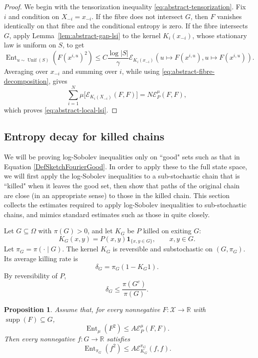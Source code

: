 \documentclass[11pt, reqno]{amsart}
\numberwithin{equation}{section}
\newtheorem{proposition}[theorem]{Proposition}
\newcommand{\Ent}{\operatorname{Ent}}
\newcommand{\cE}{\mathcal E}
\newcommand{\one}{\mathbf 1}
\newcommand{\supp}{\operatorname{supp}}
\newcommand{\Unif}{\operatorname{Unif}}
\begin{document}
\begin{proof}
We begin with the tensorization inequality \eqref{eq:abstract-tensorization}.  Fix \(i\) and condition
on \(X_{-i}=x_{-i}\).  If the fibre does not intersect \(G\), then \(F\)
vanishes identically on that fibre and the conditional entropy is zero.  If the
fibre intersects \(G\), apply Lemma~\ref{lem:abstract-gap-lsi} to the kernel
\(K_i(x_{-i})\), whose stationary law is uniform on \(S\), to get
\[
    \Ent_{u\sim\Unif(S)}(F(x^{i,u})^2)
    \le C\frac{\log |S|}{\gamma}
    \cE_{K_i(x_{-i})}(u\mapsto F(x^{i,u}),u\mapsto F(x^{i,u})).
\]
Averaging over \(x_{-i}\) and summing over \(i\), while using
\eqref{eq:abstract-fibre-decomposition}, gives
\[
    \sum_{i=1}^N\mu\bigl[\cE_{K_i(X_{-i})}(F,F)\bigr]
    =N\cE_P^\mu(F,F),
\]
which proves \eqref{eq:abstract-local-lsi}.
\end{proof}

\subsection{Entropy decay for killed chains}\label{subsec:killed-entropy}

We will be proving log-Sobolev inequalities only on ``good" sets such as that in Equation \eqref{DefSketchFourierGood}. In order to apply these to the full state space, we will first apply the log-Sobolev inequalities to a sub-stochastic chain that is ``killed" when it leaves the good set, then show that paths of the original chain are close (in an appropriate sense) to those in the killed chain. This section collects the estimates required to apply log-Sobolev inequalities to sub-stochastic chains, and mimics standard estimates such as those in \cite{DiaconisSaloffCoste1996LSI} quite closely.

Let \(G\subseteq\Omega\) with \(\pi(G)>0\), and let \(K_G\) be \(P\) killed on
exiting \(G\):
\begin{equation}\label{eq:abstract-killed-kernel}
    K_G(x,y)=P(x,y)\one_{\{x,y\in G\}},
    \qquad x,y\in G.
\end{equation}
Let \(\pi_G=\pi(\cdot\mid G)\).  The kernel \(K_G\) is reversible and
substochastic on \((G,\pi_G)\).  Its average killing rate is
\[
    \delta_G=\pi_G(1-K_G1).
\]
By reversibility of \(P\),
\begin{equation}\label{eq:abstract-killing-rate}
    \delta_G\le\frac{\pi(G^c)}{\pi(G)}.
\end{equation}

\begin{proposition}\label{prop:abstract-zero-extension}
Assume that, for every nonnegative \(F:\mathcal X\to\mathbb R\) with
\(\supp(F)\subseteq G\),
\begin{equation}\label{eq:abstract-ambient-lsi}
    \Ent_\mu(F^2)\le A\cE_P^\mu(F,F).
\end{equation}
Then every nonnegative \(f:G\to\mathbb R\) satisfies
\begin{equation}\label{eq:abstract-killed-lsi}
    \Ent_{\pi_G}(f^2)\le A\cE_{K_G}^{\pi_G}(f,f).
\end{equation}
\end{proposition}
\end{document}
